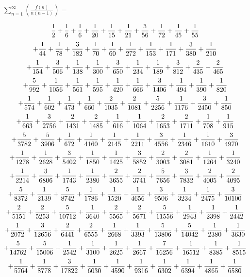 \documentclass{article}
\begin{document}
\bigskip
$\sum_{n=1}^\infty \left( \frac{f(n)}{n(n-1)} \right)=$

$$ {1\over 2}  +  {1\over 6}  +  {1\over 6}  +  {1\over 20}  +  {1\over 15}  +  {1\over 21}  +  {3\over 56}  +  {1\over 72}  +  {1\over 45}  +  {1\over 55}  $$
$$+  {1\over 44}  +  {1\over 78}  +  {3\over 182}  +  {1\over 70}  +  {1\over 60}  +  {1\over 272}  +  {1\over 153}  +  {1\over 171}  +  {3\over 380}  +  {1\over 210}  $$
$$+  {1\over 154}  +  {3\over 506}  +  {1\over 138}  +  {1\over 300}  +  {3\over 650}  +  {1\over 234}  +  {1\over 189}  +  {3\over 812}  +  {2\over 435}  +  {2\over 465}  $$
$$+  {5\over 992}  +  {1\over 1056}  +  {1\over 561}  +  {1\over 595}  +  {1\over 420}  +  {1\over 666}  +  {3\over 1406}  +  {1\over 494}  +  {1\over 390}  +  {1\over 820}  $$
$$+  {1\over 574}  +  {1\over 602}  +  {1\over 473}  +  {1\over 660}  +  {2\over 1035}  +  {2\over 1081}  +  {5\over 2256}  +  {1\over 1176}  +  {3\over 2450}  +  {1\over 850}  $$
$$+  {1\over 663}  +  {3\over 2756}  +  {2\over 1431}  +  {2\over 1485}  +  {1\over 616}  +  {1\over 1064}  +  {2\over 1653}  +  {2\over 1711}  +  {1\over 708}  +  {1\over 915}  $$
$$+  {5\over 3782}  +  {5\over 3906}  +  {1\over 672}  +  {1\over 4160}  +  {1\over 2145}  +  {1\over 2211}  +  {3\over 4556}  +  {1\over 2346}  +  {1\over 1610}  +  {3\over 4970}  $$
$$+  {1\over 1278}  +  {1\over 2628}  +  {3\over 5402}  +  {1\over 1850}  +  {1\over 1425}  +  {3\over 5852}  +  {2\over 3003}  +  {2\over 3081}  +  {1\over 1264}  +  {1\over 3240}  $$
$$+  {1\over 2214}  +  {3\over 6806}  +  {1\over 1743}  +  {1\over 2380}  +  {2\over 3655}  +  {2\over 3741}  +  {5\over 7656}  +  {3\over 7832}  +  {2\over 4005}  +  {2\over 4095}  $$
$$+  {5\over 8372}  +  {1\over 2139}  +  {5\over 8742}  +  {1\over 1786}  +  {1\over 1520}  +  {1\over 4656}  +  {3\over 9506}  +  {1\over 3234}  +  {1\over 2475}  +  {3\over 10100}  $$
$$+  {2\over 5151}  +  {2\over 5253}  +  {5\over 10712}  +  {1\over 3640}  +  {2\over 5565}  +  {2\over 5671}  +  {5\over 11556}  +  {1\over 2943}  +  {1\over 2398}  +  {1\over 2442}  $$
$$+  {1\over 2072}  +  {3\over 12656}  +  {2\over 6441}  +  {2\over 6555}  +  {1\over 2668}  +  {1\over 3393}  +  {5\over 13806}  +  {5\over 14042}  +  {1\over 2380}  +  {1\over 3630}  $$
$$+  {5\over 14762}  +  {5\over 15006}  +  {1\over 2542}  +  {1\over 3100}  +  {1\over 2625}  +  {1\over 2667}  +  {7\over 16256}  +  {1\over 16512}  +  {1\over 8385}  +  {1\over 8515}  $$
$$+  {1\over 5764}  +  {1\over 8778}  +  {3\over 17822}  +  {1\over 6030}  +  {1\over 4590}  +  {1\over 9316}  +  {1\over 6302}  +  {1\over 6394}  +  {1\over 4865}  +  {1\over 6580}  $$
\end{document}
